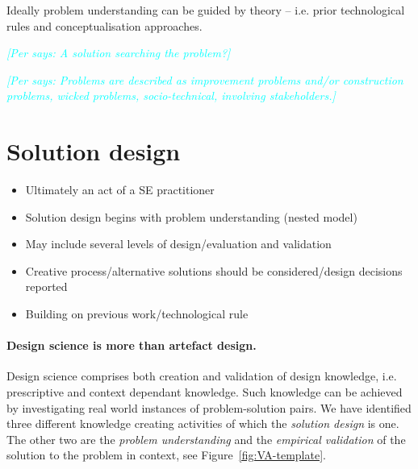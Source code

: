 \documentclass[graybox]{svmult}
\newcommand{\per}[1]{\textcolor{cyan}{{\it [Per says: #1]}}}
\newcommand{\per}[1]{}
\begin{document}

Ideally problem understanding can be guided by theory -- i.e. prior technological rules and conceptualisation approaches. 



\per{A solution searching the problem?}

\per{Problems are described as improvement problems and/or construction problems, wicked problems, socio-technical, involving stakeholders.} 



\section{Solution design}

\begin{itemize}
\item Ultimately an act of a SE practitioner
\item Solution design begins with problem understanding (nested model)
\item May include several levels of design/evaluation and validation 
\item Creative process/alternative solutions should be considered/design decisions reported
\item Building on previous work/technological rule	
\end{itemize}



\paragraph{Design science is more than artefact design.}

Design science comprises both creation and validation of design knowledge, i.e. prescriptive and context dependant knowledge. Such knowledge can be achieved by investigating real world instances of problem-solution pairs. We have identified three different knowledge creating activities of which the \emph{solution design} is one. The other two are the \emph{problem understanding} and the \emph{empirical validation} of the solution to the problem in context, see Figure~\ref{fig:VA-template}.
\end{document}
